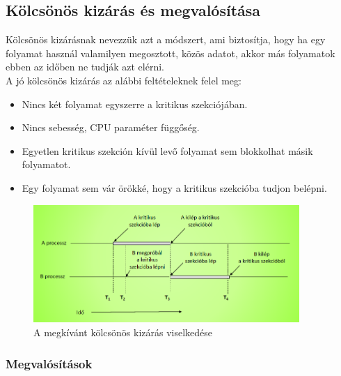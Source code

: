 \documentclass[margin=0px]{article}
\begin{document}
	\subsection{Kölcsönös kizárás és megvalósítása}
	
	Kölcsönös kizárásnak nevezzük azt a módszert, ami biztosítja, hogy ha egy folyamat használ valamilyen megosztott, közös adatot, akkor más folyamatok ebben az időben ne tudják azt elérni. \\
	A jó kölcsönös kizárás az alábbi feltételeknek felel meg:
	\begin{itemize}
		\item Nincs két folyamat egyszerre a kritikus szekciójában.
		\item Nincs sebesség, CPU paraméter függőség.
		\item Egyetlen kritikus szekción kívül levő folyamat sem blokkolhat másik folyamatot.
		\item Egy folyamat sem vár örökké, hogy a kritikus szekcióba tudjon belépni.
	\end{itemize}
	
	\begin{figure}[H]
		\centering
		\includegraphics[width=0.9\textwidth]{img/mutex.png}
		\caption{A megkívánt kölcsönös kizárás viselkedése}
	\end{figure}
	
	\subsubsection{Megvalósítások}
	
\end{document}
